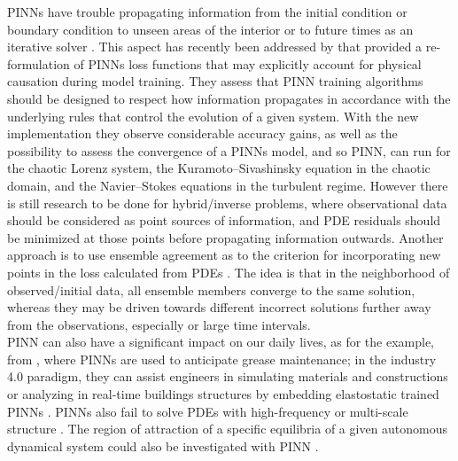 \documentclass[pdflatex,sn-basic]{sn-jnl}%
\theoremstyle{thmstyleone}%
\theoremstyle{thmstyletwo}%
\theoremstyle{thmstylethree}%
\begin{document}
PINNs have trouble propagating information from the initial condition or boundary condition to unseen areas of the interior or to future times as an iterative solver \citep{Jin2021_NsfnetsNavierStokes_CaiJCLK, Dwi2020_PhysicsInformedExtreme_SriDS}.
This aspect has recently been addressed by \cite{Wan2022_RespectingCausalityIs_SanWSP}
that provided a re-formulation of PINNs loss functions that may explicitly account for physical causation during model training. They assess that PINN training algorithms should be designed to respect how information propagates in accordance with the underlying rules that control the evolution of a given system.
With the new implementation they observe considerable accuracy gains, as well as the possibility to assess the convergence of a PINNs model, and so PINN, can run for the chaotic Lorenz system, the Kuramoto–Sivashinsky equation in the chaotic domain, and the Navier–Stokes equations in the turbulent regime. However there is still research to be done for hybrid/inverse problems, where observational data should be considered as point sources of information, and PDE residuals should be minimized at those points before propagating information outwards. 
%
Another approach is to use ensemble agreement as to the criterion for incorporating new points in the loss calculated from PDEs \citep{Hai2022_ImprovedTrainingPhysics_IliHI}.
The idea is that in the neighborhood of observed/initial data, all ensemble members converge to the same solution, whereas they may be driven towards different incorrect solutions further away from the observations, especially or large time intervals.
\noindent
\\



PINN can also have a significant impact on our daily lives,
%
as for the example, from \cite{Yuc2021_HybridPhysicsInformed_ViaYV}, where PINNs are used to anticipate grease maintenance; in the industry 4.0 paradigm, they can assist engineers in simulating materials and constructions or analyzing in real-time buildings structures by embedding elastostatic trained PINNs \citep{Hag2021_PhysicsInformedDeep_RaiHRM, Min2020_SurrogateModelComputational_TroMNTKNRZ}.
%
PINNs also fail to solve PDEs with high-frequency or multi-scale structure 
\citep{Wan2022_WhenWhyPinns_YuWYP, Wan2021_UnderstandingMitigatingGradient_TenWTP, Fuk2020_LimitationsPhysicsInformed_TchFT}.
%
%
The region of attraction of a specific equilibria of a given autonomous dynamical system could also be investigated with PINN \citep{Sch2021_LearningEstimateRegions_HaySH}.
\end{document}
